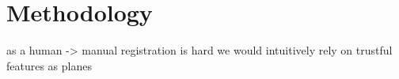 
\chapter{Methodology}

as a human -> manual registration is hard
we would intuitively rely on trustful features as planes

